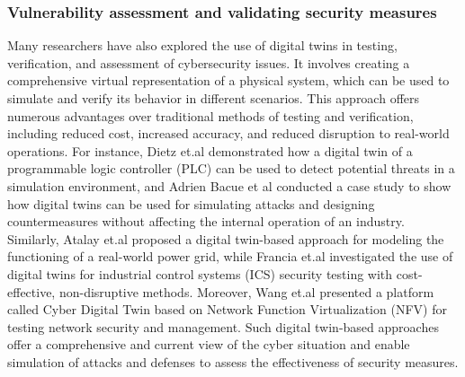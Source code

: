 
\subsubsection{Vulnerability assessment and validating security measures}

Many researchers have also explored the use of digital twins in testing, verification, and assessment of cybersecurity issues. It involves creating a comprehensive virtual representation of a physical system, which can be used to simulate and verify its behavior in different scenarios. This approach offers numerous advantages over traditional methods of testing and verification, including reduced cost\cite{franciaDigitalTwinsIndustrial2021, jiaqiliSpaceSpiderHyper2022, shitoleRealTimeDigitalTwin2021, maillet-contozEndtoendSecurityValidation2020}, increased accuracy\cite{sugumarAssessmentMethodDetecting2019, atalayDigitalTwinsApproach2020}, and reduced disruption \cite{franciaDigitalTwinsIndustrial2021, atalayDigitalTwinsApproach2020, adrienbacueDigitalTwinsEnhanced2022} to real-world operations. For instance, Dietz et.al\cite{dietzEmployingDigitalTwins2022} demonstrated how a digital twin of a programmable logic controller (PLC) can be used to detect potential threats in a simulation environment, and Adrien Bacue et al \cite{adrienbacueDigitalTwinsEnhanced2022} conducted a case study to show how digital twins can be used for simulating attacks and designing countermeasures without affecting the internal operation of an industry. Similarly, Atalay et.al \cite{atalayDigitalTwinsApproach2020} proposed a digital twin-based approach for modeling the functioning of a real-world power grid, while Francia et.al \cite{franciaDigitalTwinsIndustrial2021} investigated the use of digital twins for industrial control systems (ICS) security testing with cost-effective, non-disruptive methods. Moreover, Wang et.al \cite{wangDTCPNDigitalTwin2022} presented a platform called Cyber Digital Twin based on Network Function Virtualization (NFV) for testing network security and management. Such digital twin-based approaches offer a comprehensive and current view of the cyber situation and enable simulation of attacks and defenses to assess the effectiveness of security measures.


